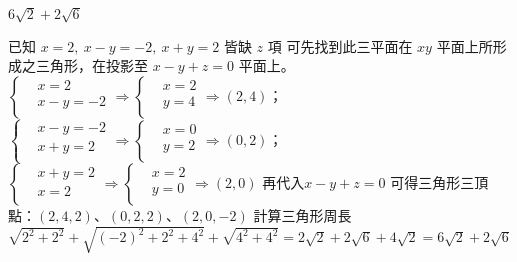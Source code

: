 \begin{QUESTIONS}
\begin{QUESTION}
        \begin{QFROMS}
        \end{QFROMS}
        \begin{QTAGS}\end{QTAGS}
        \begin{QANS}
            $6 \sqrt{2} + 2\sqrt{6}$
        \end{QANS}
        \begin{QSOLLIST}
            \begin{QSOL}
			已知 $x=2,\ x-y=-2,\ x+y=2$ 皆缺 $z$ 項
			可先找到此三平面在 $xy$ 平面上所形成之三角形，在投影至 $x-y+z=0$ 平面上。
			$\left\{ \begin{aligned}
			  & x=2 \\ 
			 & x-y=-2 \\ 
			\end{aligned} \right.\Rightarrow \left\{ \begin{aligned}
			  & x=2 \\ 
			 & y=4 \\ 
			\end{aligned} \right.\Rightarrow \left( 2,4 \right)$； $\left\{ \begin{aligned}
			  & x-y=-2 \\ 
			 & x+y=2 \\ 
			\end{aligned} \right.\Rightarrow \left\{ \begin{aligned}
			  & x=0 \\ 
			 & y=2 \\ 
			\end{aligned} \right.\Rightarrow \left( 0,2 \right)$；$\left\{ \begin{aligned}
			  & x+y=2 \\ 
			 & x=2 \\ 
			\end{aligned} \right.\Rightarrow \left\{ \begin{aligned}
			  & x=2 \\ 
			 & y=0 \\ 
			\end{aligned} \right.\Rightarrow \left( 2,0 \right)$
			再代入$x-y+z=0$ 可得三角形三頂點：$\left( 2,4,2 \right)$、$\left( 0,2,2 \right)$、$\left( 2,0,-2 \right)$
			計算三角形周長 $\sqrt{{{2}^{2}}+{{2}^{2}}}+\sqrt{{{\left( -2 \right)}^{2}}+{{2}^{2}}+{{4}^{2}}}+\sqrt{{{4}^{2}}+{{4}^{2}}}=2\sqrt{2}+2\sqrt{6}+4\sqrt{2}=6\sqrt{2}+2\sqrt{6}$
			\end{QSOL}

\end{QSOLLIST}
\end{QUESTION}
\end{QUESTIONS}
